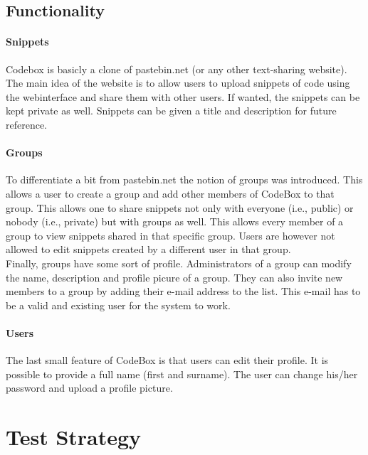 \documentclass[10pt,a4paper,BCOR12mm, headexclude, footexclude,
  twoside, openright]{scrartcl} \usepackage[scaled]{helvet}
\numberwithin{equation}{section} %
\numberwithin{figure}{section} %
\numberwithin{table}{section} %
\begin{document}
\subsection{Functionality}
\paragraph{Snippets}
Codebox is basicly a clone of pastebin.net (or any other text-sharing
website). The main idea of the website is to allow users to upload snippets of
code using the webinterface and share them with other users. If wanted, the
snippets can be kept private as well. Snippets can be given a title and
description for future reference.

\paragraph{Groups}
To differentiate a bit from pastebin.net the notion of groups was
introduced. This allows a user to create a group and add other members of
CodeBox to that group. This allows one to share snippets not only with everyone
(i.e., public) or nobody (i.e., private) but with groups as well. This allows
every member of a group to view snippets shared in that specific group. Users
are however not allowed to edit snippets created by a different user in that
group.\\ Finally, groups have some sort of profile. Administrators of a group
can modify the name, description and profile picure of a group. They can also
invite new members to a group by adding their e-mail address to the list. This
e-mail has to be a valid and existing user for the system to work.

\paragraph{Users}
The last small feature of CodeBox is that users can edit their profile. It is
possible to provide a full name (first and surname). The user can change his/her
password and upload a profile picture.
\section{Test Strategy}
\end{document}
